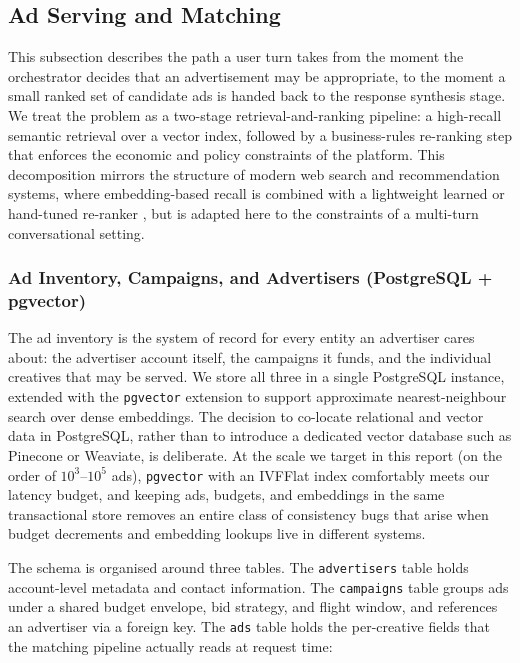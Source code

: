 \subsection{Ad Serving and Matching}
\label{subsec:ad-serving-matching}

This subsection describes the path a user turn takes from the moment the
orchestrator decides that an advertisement may be appropriate, to the moment a
small ranked set of candidate ads is handed back to the response synthesis
stage. We treat the problem as a two-stage retrieval-and-ranking pipeline: a
high-recall semantic retrieval over a vector index, followed by a
business-rules re-ranking step that enforces the economic and policy
constraints of the platform. This decomposition mirrors the structure of
modern web search and recommendation systems, where embedding-based recall is
combined with a lightweight learned or hand-tuned re-ranker
\cite{karpukhin2020dpr}, but is adapted here to the constraints of a
multi-turn conversational setting.

\subsubsection{Ad Inventory, Campaigns, and Advertisers (PostgreSQL + pgvector)}
\label{subsubsec:ad-inventory-store}

The ad inventory is the system of record for every entity an advertiser cares
about: the advertiser account itself, the campaigns it funds, and the
individual creatives that may be served. We store all three in a single
PostgreSQL instance, extended with the \texttt{pgvector} extension to support
approximate nearest-neighbour search over dense embeddings. The decision to
co-locate relational and vector data in PostgreSQL, rather than to introduce a
dedicated vector database such as Pinecone or Weaviate, is deliberate. At the
scale we target in this report (on the order of $10^3$--$10^5$ ads),
\texttt{pgvector} with an IVFFlat index comfortably meets our latency budget,
and keeping ads, budgets, and embeddings in the same transactional store
removes an entire class of consistency bugs that arise when budget
decrements and embedding lookups live in different systems.

The schema is organised around three tables. The \texttt{advertisers} table
holds account-level metadata and contact information. The \texttt{campaigns}
table groups ads under a shared budget envelope, bid strategy, and flight
window, and references an advertiser via a foreign key. The \texttt{ads}
table holds the per-creative fields that the matching pipeline actually reads
at request time:

